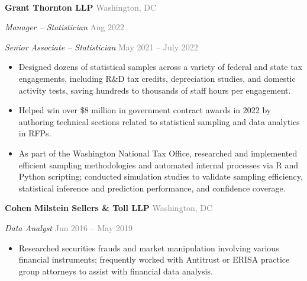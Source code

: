 \documentclass[12pt]{article}
\begin{document}
\textcolor{lightgray}{\hrulefill}\\

\begin{small}
  
  \textbf{Grant Thornton LLP} \hfill \textcolor{gray}{Washington, DC}
  
  \textit{Manager -- Statistician} \hfill 
  \textcolor{gray}{Aug 2022}
  
  
  \textit{Senior Associate -- Statistician} \hfill 
  \textcolor{gray}{May 2021 -- July 2022}
  
  
  \vspace{-2mm}

  \begin{itemize}[leftmargin=0.5cm]
      \setlength\itemsep{-1mm}
      
    \item Designed dozens of statistical samples across a variety of federal and state tax engagements, including R\&D tax credits, depreciation studies, and domestic activity tests, saving hundreds to thousands of staff hours per engagement.
      
    \item Helped win over \$8 million in government contract awards in 2022 by authoring technical sections related to statistical sampling and data analytics in RFPs.
      
    \item As part of the Washington National Tax Office, researched and implemented efficient sampling methodologies and automated internal processes via R and Python scripting; conducted simulation studies to validate sampling efficiency, statistical inference and prediction performance, and confidence coverage.
      
  \end{itemize}
  \vspace{-2mm}
  
  \textbf{Cohen Milstein Sellers \& Toll LLP} \hfill \textcolor{gray}{Washington, DC}
  
  \textit{Data Analyst} \hfill 
  \textcolor{gray}{Jun 2016 -- May 2019}
  
  
  \vspace{-2mm}

  \begin{itemize}[leftmargin=0.5cm]
      \setlength\itemsep{-1mm}
      
    \item Researched securities frauds and market manipulation involving various financial instruments; frequently worked with Antitrust or ERISA practice group attorneys to assist with financial data analysis.
      

\end{itemize}
\end{small}
\end{document}
